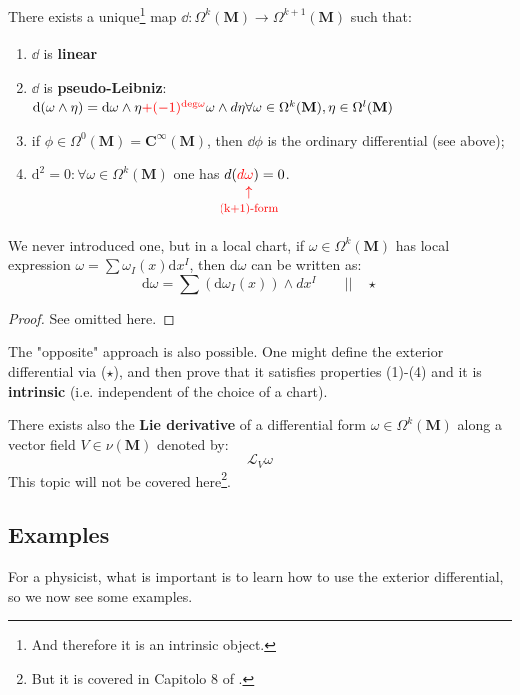 \documentclass[../main.tex]{subfiles}
\begin{document}
\begin{theorem}[E. Cartan]
There exists a unique\footnote{And therefore it is an intrinsic object.} map $\dd:\Omega^k(\mathbf{M})\xrightarrow[]{}\Omega^{k+1}(\mathbf{M})$ such that:
\begin{enumerate}
    \item $\dd$ is \textbf{linear}
    \item $\dd$ is \textbf{pseudo-Leibniz}: $\dd(\omega\wedge\eta)=\dd\omega\wedge\eta{\color{red}+(-1)^{\text{\textrm{deg}}\omega}}\omega\wedge d\eta\\ \forall\omega\in\Omega^k(\mathbf{M}),\eta\in\Omega^l(\mathbf{M})$
    \item if $\phi\in\Omega^0(\mathbf{M})=\mathbf{C^{\infty}(\mathbf{M})}$, then $\dd\phi$ is the ordinary differential (see above);
    \item $\textrm{d}^2=0:\forall\omega\in\Omega^k(\mathbf{M})$ one has $d({\color{red}d\underset{\mathclap{\tikz \node {$\uparrow$} node [below=1ex] {\footnotesize (k+1)-form };}}\omega})=0$.
\end{enumerate}
\end{theorem}
We never introduced one, but in a local chart, if $\omega\in\Omega^k(\mathbf{M})$ has local expression $\omega=\sum\omega_I(x)\textrm{d}x^I$,  then $\textrm{d}\omega$ can be written as:
\[
\textrm{d}\omega=\sum(\textrm{d}\omega_I(x))\wedge dx^I \qquad \Big|\Big| \quad \star
\]
\begin{proof}
See  omitted here.
\end{proof}
\begin{kaobox}[frametitle=Remark]
The "opposite" approach is also possible. One might define the exterior differential via ($\star$), and then prove that it satisfies properties (1)-(4) and it is \textbf{intrinsic} (i.e. independent of the choice of a chart).
\end{kaobox}
\begin{kaobox}[frametitle=Remark]
There exists also the \textbf{Lie derivative} of a differential form $\omega\in\Omega^k(\mathbf{M})$ along a vector field $V\in\nu(\mathbf{M})$ denoted by:
\[
\mathcal{L}_V\omega
\]
This topic will not be covered here\footnote{But it is covered in Capitolo 8 of \cite{ferrari2020general}.}.
\end{kaobox}
\subsection{Examples}
For a physicist, what is important is to learn how to use the exterior differential, so we now see some examples.\\
\end{document}
